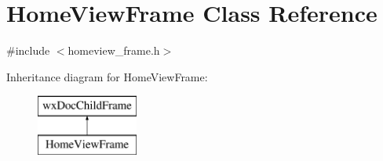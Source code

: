 \hypertarget{a00107}{\section{Home\-View\-Frame Class Reference}
\label{a00107}
}


{\ttfamily \#include $<$homeview\-\_\-frame.\-h$>$}

Inheritance diagram for Home\-View\-Frame\-:\begin{figure}[H]
\begin{center}
\leavevmode
\includegraphics[height=2.000000cm]{a00107}
\end{center}
\end{figure}
